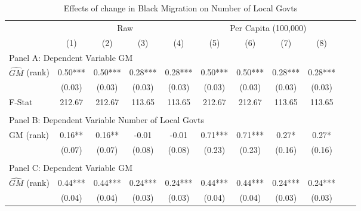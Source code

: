  \begin{table}[htbp]\centering {} \begin{threeparttable} \caption{Effects of change in Black Migration on Number of Local Govts} \begin{tabular}{l*{10}{c}} \toprule
                &\multicolumn{4}{c}{Raw}                                    &\multicolumn{4}{c}{Per Capita (100,000)}                   \\\cmidrule(lr){2-5}\cmidrule(lr){6-9}
                &\multicolumn{1}{c}{(1)}   &\multicolumn{1}{c}{(2)}   &\multicolumn{1}{c}{(3)}   &\multicolumn{1}{c}{(4)}   &\multicolumn{1}{c}{(5)}   &\multicolumn{1}{c}{(6)}   &\multicolumn{1}{c}{(7)}   &\multicolumn{1}{c}{(8)}   \\
\cmidrule(lr){1-9}
\multicolumn{8}{l}{Panel A: Dependent Variable GM}\\
\cmidrule(lr){1-9}
$\hat{GM}$ (rank)&       0.50***&       0.50***&       0.28***&       0.28***&       0.50***&       0.50***&       0.28***&       0.28***\\
                &     (0.03)   &     (0.03)   &     (0.03)   &     (0.03)   &     (0.03)   &     (0.03)   &     (0.03)   &     (0.03)   \\
\midrule
F-Stat          &     212.67   &     212.67   &     113.65   &     113.65   &     212.67   &     212.67   &     113.65   &     113.65   \\
\cmidrule[\heavyrulewidth](lr){1-9} \\ \cmidrule[\heavyrulewidth](lr){1-9}
\multicolumn{8}{l}{Panel B: Dependent Variable Number of Local Govts}\\
\cmidrule(lr){1-9}
GM  (rank)      &       0.16** &       0.16** &      -0.01   &      -0.01   &       0.71***&       0.71***&       0.27*  &       0.27*  \\
                &     (0.07)   &     (0.07)   &     (0.08)   &     (0.08)   &     (0.23)   &     (0.23)   &     (0.16)   &     (0.16)   \\
\cmidrule[\heavyrulewidth](lr){1-9} \\ \cmidrule[\heavyrulewidth](lr){1-9}
\multicolumn{8}{l}{Panel C: Dependent Variable GM}\\
\cmidrule(lr){1-9}
$\hat{GM}$ (rank)&       0.44***&       0.44***&       0.24***&       0.24***&       0.44***&       0.44***&       0.24***&       0.24***\\
                &     (0.04)   &     (0.04)   &     (0.03)   &     (0.03)   &     (0.04)   &     (0.04)   &     (0.03)   &     (0.03)   \\

\end{tabular}
\end{threeparttable}
\end{table}
